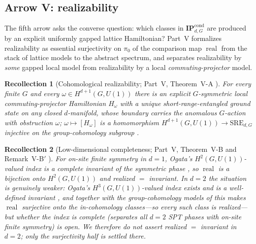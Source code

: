 \documentclass[12pt]{article}
\newcommand{\IPcond}{\mathbf{IP}^{\mathrm{cond}}}  %
\newcommand{\Uone}{U(1)}
\newcommand{\SRE}{\mathrm{SRE}}
\newcommand{\real}{\operatorname{real}}        %
\theoremstyle{plain}
\newtheorem{recollection}[recollection]{Recollection}
\theoremstyle{definition}
\theoremstyle{remark}
\begin{document}
\subsection{Arrow V: realizability}
\label{sec:arrowV}

The fifth arrow asks the converse question: which classes in $\IPcond_{d,G}$ are
produced by an explicit uniformly gapped lattice Hamiltonian? Part~V formalizes
realizability as essential surjectivity on $\pi_0$ of the comparison map $\real$ from
the stack of lattice models to the abstract spectrum, and separates realizability by
\emph{some} gapped local model from realizability by a local \emph{commuting-projector}
model.

\begin{recollection}[Cohomological realizability; Part~V, Theorem~V-A \cite{paperRealizability}]
\label{rec:VA}
For every finite $G$ and every $\omega\in H^{d+1}(G,\Uone)$ there is an explicit
$G$-symmetric local commuting-projector Hamiltonian $H_\omega$ with a unique
short-range-entangled ground state on any closed $d$-manifold, whose boundary carries the
anomalous $G$-action with obstruction $\omega$; $\omega\mapsto[H_\omega]$ is a
homomorphism $H^{d+1}(G,\Uone)\to\SRE_{d,G}$ injective on the group-cohomology subgroup
\cite{cglw-cohomology,else-nayak}.
\end{recollection}

\begin{recollection}[Low-dimensional completeness; Part~V, Theorem~V-B and Remark~V-B$'$ \cite{paperRealizability}]
\label{rec:VB}
For on-site finite symmetry in $d=1$, Ogata's $H^2(G,\Uone)$-valued index is a
\emph{complete} invariant of the symmetric phase
\cite{ogata-spt-chains,ogata-classification-review}, so $\real$ is a bijection onto
$H^2(G,\Uone)$ and realized $=$ invariant. In $d=2$ the situation is genuinely weaker:
Ogata's $H^3(G,\Uone)$-valued index \emph{exists} and is a well-defined invariant
\cite{ogata-h3-index}, and together with the group-cohomology models of  this
makes $\real$ \emph{surjective} onto the in-cohomology classes---so every such class is
realized---but whether the index is \emph{complete} (separates all $d=2$ SPT phases with
on-site finite symmetry) is open. We therefore do \emph{not} assert realized $=$ invariant
in $d=2$; only the surjectivity half is settled there.
\end{recollection}
\end{document}

